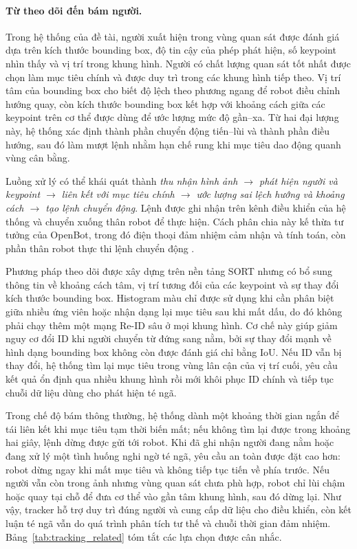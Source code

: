 \paragraph{Từ theo dõi đến bám người.}
Trong hệ thống của đề tài, người xuất hiện trong vùng quan sát được đánh giá dựa trên kích thước bounding box, độ tin cậy của phép phát hiện, số keypoint nhìn thấy và vị trí trong khung hình. Người có chất lượng quan sát tốt nhất được chọn làm mục tiêu chính và được duy trì trong các khung hình tiếp theo. Vị trí tâm của bounding box cho biết độ lệch theo phương ngang để robot điều chỉnh hướng quay, còn kích thước bounding box kết hợp với khoảng cách giữa các keypoint trên cơ thể được dùng để ước lượng mức độ gần--xa. Từ hai đại lượng này, hệ thống xác định thành phần chuyển động tiến--lùi và thành phần điều hướng, sau đó làm mượt lệnh nhằm hạn chế rung khi mục tiêu dao động quanh vùng cân bằng.

Luồng xử lý có thể khái quát thành \textit{thu nhận hình ảnh $\rightarrow$ phát hiện người và keypoint $\rightarrow$ liên kết với mục tiêu chính $\rightarrow$ ước lượng sai lệch hướng và khoảng cách $\rightarrow$ tạo lệnh chuyển động}. Lệnh được ghi nhận trên kênh điều khiển của hệ thống và chuyển xuống thân robot để thực hiện. Cách phân chia này kế thừa tư tưởng của OpenBot, trong đó điện thoại đảm nhiệm cảm nhận và tính toán, còn phần thân robot thực thi lệnh chuyển động .

Phương pháp theo dõi được xây dựng trên nền tảng SORT nhưng có bổ sung thông tin về khoảng cách tâm, vị trí tương đối của các keypoint và sự thay đổi kích thước bounding box. Histogram màu chỉ được sử dụng khi cần phân biệt giữa nhiều ứng viên hoặc nhận dạng lại mục tiêu sau khi mất dấu, do đó không phải chạy thêm một mạng Re-ID sâu ở mọi khung hình. Cơ chế này giúp giảm nguy cơ đổi ID khi người chuyển từ đứng sang nằm, bởi sự thay đổi mạnh về hình dạng bounding box không còn được đánh giá chỉ bằng IoU. Nếu ID vẫn bị thay đổi, hệ thống tìm lại mục tiêu trong vùng lân cận của vị trí cuối, yêu cầu kết quả ổn định qua nhiều khung hình rồi mới khôi phục ID chính và tiếp tục chuỗi dữ liệu dùng cho phát hiện té ngã.

Trong chế độ bám thông thường, hệ thống dành một khoảng thời gian ngắn để tái liên kết khi mục tiêu tạm thời biến mất; nếu không tìm lại được trong khoảng hai giây, lệnh dừng được gửi tới robot. Khi đã ghi nhận người đang nằm hoặc đang xử lý một tình huống nghi ngờ té ngã, yêu cầu an toàn được đặt cao hơn: robot dừng ngay khi mất mục tiêu và không tiếp tục tiến về phía trước. Nếu người vẫn còn trong ảnh nhưng vùng quan sát chưa phù hợp, robot chỉ lùi chậm hoặc quay tại chỗ để đưa cơ thể vào gần tâm khung hình, sau đó dừng lại. Như vậy, tracker hỗ trợ duy trì đúng người và cung cấp dữ liệu cho điều khiển, còn kết luận té ngã vẫn do quá trình phân tích tư thế và chuỗi thời gian đảm nhiệm. Bảng~\ref{tab:tracking_related} tóm tắt các lựa chọn được cân nhắc.

